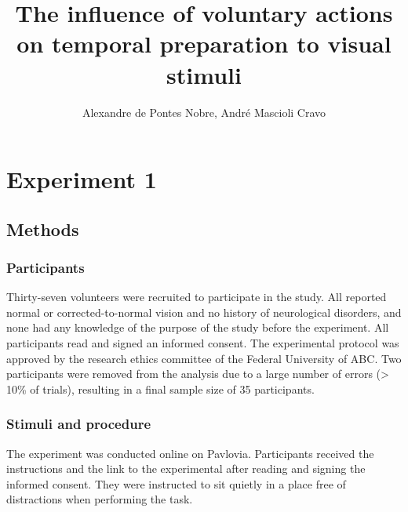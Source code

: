 \documentclass{article}
\title{The influence of voluntary actions on temporal preparation to visual stimuli}
\author{Alexandre de Pontes Nobre, André Mascioli Cravo}
\begin{document}


\maketitle

\section{Experiment 1}

\graphicspath{{./Figures/Exp_1/}}

\subsection{Methods}

\subsubsection{Participants}
Thirty-seven volunteers were recruited to participate in the study. All reported normal or corrected-to-normal vision and no history of neurological disorders, and none had any knowledge of the purpose of the study before the experiment. All participants read and signed an informed consent. The experimental protocol was approved by the research ethics committee of the Federal University of ABC. Two participants were removed from the analysis due to a large number of errors (> 10\% of trials), resulting in a final sample size of 35 participants.


\subsubsection{Stimuli and procedure}
The experiment was conducted online on Pavlovia. Participants received the instructions and the link to the experimental after reading and signing the informed consent. They were instructed to sit quietly in a place free of distractions when performing the task.
\end{document}
